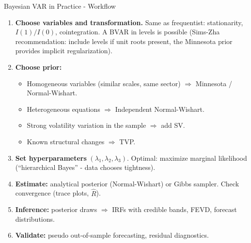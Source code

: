 \documentclass{beamer}
\begin{document}
\begin{frame}{Bayesian VAR in Practice - Workflow}
\small

\begin{enumerate}
  \item \textbf{Choose variables and transformation.}
        Same as frequentist: stationarity, $I(1)/I(0)$, cointegration.
        A BVAR in levels is possible (Sims-Zha recommendation: include levels if unit roots present,
        the Minnesota prior provides implicit regularization).

  \item \textbf{Choose prior:}
  \begin{itemize}
    \item Homogeneous variables (similar scales, same sector) $\Rightarrow$ Minnesota / Normal-Wishart.
    \item Heterogeneous equations $\Rightarrow$ Independent Normal-Wishart.
    \item Strong volatility variation in the sample $\Rightarrow$ add SV.
    \item Known structural changes $\Rightarrow$ TVP.
  \end{itemize}

  \item \textbf{Set hyperparameters} $(\lambda_1, \lambda_2, \lambda_3)$.
  Optimal: maximize marginal likelihood (``hierarchical Bayes'' - data chooses tightness).

  \item \textbf{Estimate:} analytical posterior (Normal-Wishart) or Gibbs sampler.
        Check convergence (trace plots, $\hat R$).

  \item \textbf{Inference:} posterior draws $\Rightarrow$ IRFs with credible bands, FEVD,
        forecast distributions.

  \item \textbf{Validate:} pseudo out-of-sample forecasting, residual diagnostics.
\end{enumerate}

\end{frame}
\end{document}
